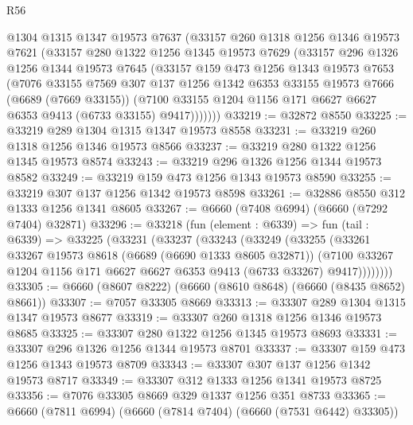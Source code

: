 \begin{lexlean}{R56}
\begin{coremodule}
      @1304
      @1315
      @1347
      @19573
      @7637
      (@33157
        @260
        @1318
        @1256
        @1346
        @19573
        @7621
        (@33157
          @280
          @1322
          @1256
          @1345
          @19573
          @7629
          (@33157
            @296
            @1326
            @1256
            @1344
            @19573
            @7645
            (@33157
              @159
              @473
              @1256
              @1343
              @19573
              @7653
              (@7076
                @33155
                @7569
                @307
                @137
                @1256
                @1342
                @6353
                @33155
                @19573
                @7666
                (@6689 (@7669 @33155))
                (@7100 @33155 @1204 @1156 @171 @6627 @6627 @6353 @9413 (@6733 @33155) @9417)))))))
@33219 := @32872 @8550
@33225 := @33219 @289 @1304 @1315 @1347 @19573 @8558
@33231 := @33219 @260 @1318 @1256 @1346 @19573 @8566
@33237 := @33219 @280 @1322 @1256 @1345 @19573 @8574
@33243 := @33219 @296 @1326 @1256 @1344 @19573 @8582
@33249 := @33219 @159 @473 @1256 @1343 @19573 @8590
@33255 := @33219 @307 @137 @1256 @1342 @19573 @8598
@33261 := @32886 @8550 @312 @1333 @1256 @1341 @8605
@33267 := @6660 (@7408 @6994) (@6660 (@7292 @7404) @32871)
@33296 := @33218
    (fun (element : @6339) =>
    fun (tail : @6339) =>
    @33225
      (@33231
        (@33237
          (@33243
            (@33249
              (@33255
                (@33261
                  @33267
                  @19573
                  @8618
                  (@6689 (@6690 @1333 @8605 @32871))
                  (@7100
                    @33267
                    @1204
                    @1156
                    @171
                    @6627
                    @6627
                    @6353
                    @9413
                    (@6733 @33267)
                    @9417))))))))
@33305 := @6660 (@8607 @8222) (@6660 (@8610 @8648) (@6660 (@8435 @8652) @8661))
@33307 := @7057 @33305 @8669
@33313 := @33307 @289 @1304 @1315 @1347 @19573 @8677
@33319 := @33307 @260 @1318 @1256 @1346 @19573 @8685
@33325 := @33307 @280 @1322 @1256 @1345 @19573 @8693
@33331 := @33307 @296 @1326 @1256 @1344 @19573 @8701
@33337 := @33307 @159 @473 @1256 @1343 @19573 @8709
@33343 := @33307 @307 @137 @1256 @1342 @19573 @8717
@33349 := @33307 @312 @1333 @1256 @1341 @19573 @8725
@33356 := @7076 @33305 @8669 @329 @1337 @1256 @351 @8733
@33365 := @6660 (@7811 @6994) (@6660 (@7814 @7404) (@6660 (@7531 @6442) @33305))

\end{coremodule}
\end{lexlean}
